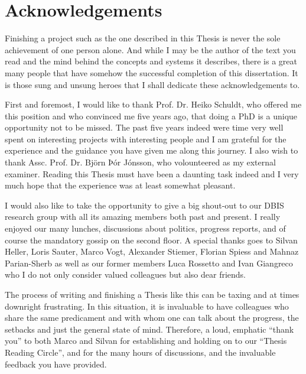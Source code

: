 
\chapter{Acknowledgements}

Finishing a project such as the one described in this Thesis is never the sole achievement of one person alone. And while I may be the author of the text you read and the mind behind the concepts and systems it describes, there is a great many people that have somehow the successful completion of this dissertation. It is those sung and unsung heroes that I shall dedicate these acknowledgements to.

First and foremost, I would like to thank Prof. Dr. Heiko Schuldt, who offered me this position and who convinced me five years ago, that doing a PhD is a unique opportunity not to be missed. The past five years indeed were time very well spent on interesting projects with interesting people and I am grateful for the experience and the guidance you have given me along this journey. I also wish to thank Assc. Prof. Dr. Björn Þór Jónsson, who volounteered as my external examiner. Reading this Thesis must have been a daunting task indeed and I very much hope that the experience was at least somewhat pleasant.

I would also like to take the opportunity to give a big shout-out to our DBIS research group with all its amazing members both past and present. I really enjoyed our many lunches, discussions about politics, progress reports, and of course the mandatory gossip on the second floor. A special thanks goes to Silvan Heller, Loris Sauter, Marco Vogt, Alexander Stiemer, Florian Spiess and Mahnaz Parian-Sherb as well as our former members Luca Rossetto and Ivan Giangreco who I do not only consider valued colleagues but also dear friends.  

The process of writing and finishing a Thesis like this can be taxing and at times downright frustrating. In this situation, it is invaluable to have colleagues who share the same predicament and with whom one can talk about the progress, the setbacks and just the general state of mind. Therefore, a loud, emphatic ``thank you'' to both Marco and Silvan for establishing and holding on to our ``Thesis Reading Circle'', and for the many hours of discussions, and the invaluable feedback you have provided.

